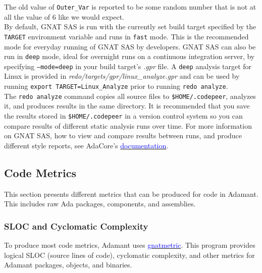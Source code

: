 The old value of \texttt{Outer\_Var} is reported to be some random number that is not at all the value of 6 like we would expect. \\

By default, GNAT SAS is run with the currently set build target specified by the \texttt{TARGET} environment variable and runs in \texttt{fast} mode. This is the recommended mode for everyday running of GNAT SAS by developers. GNAT SAS can also be run in \texttt{deep} mode, ideal for overnight runs on a continuous integration server, by specifying \texttt{---mode=deep} in your build target's \textit{.gpr} file. A \texttt{deep} analysis target for Linux is provided in \textit{redo/targets/gpr/linux\_analyze.gpr} and can be used by running \texttt{export TARGET=Linux\_Analyze} prior to running \texttt{redo analyze}. \\

The \texttt{redo analyze} command copies all source files to \texttt{\$HOME/.codepeer}, analyzes it, and produces results in the same directory. It is recommended that you save the results stored in \texttt{\$HOME/.codepeer} in a version control system so you can compare results of different static analysis runs over time. For more information on GNAT SAS, how to view and compare results between runs, and produce different style reports, see AdaCore's \href{https://docs.adacore.com/live/wave/gnatsas/html/user_guide/getting_started.html}{\textcolor{blue}{documentation}}.

\subsection{Code Metrics} \label{Code Metrics}

This section presents different metrics that can be produced for code in Adamant. This includes raw Ada packages, components, and assemblies.

\subsubsection{SLOC and Cyclomatic Complexity}

To produce most code metrics, Adamant uses \href{https://gcc.gnu.org/onlinedocs/gcc-4.8.4/gnat_ugn/The-GNAT-Metric-Tool-gnatmetric.html}{\textcolor{blue}{gnatmetric}}. This program provides logical SLOC (source lines of code), cyclomatic complexity, and other metrics for Adamant packages, objects, and binaries. \\

